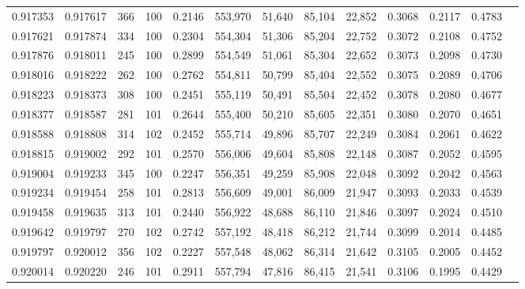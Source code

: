 \begin{tabular}{rrrrrrrrrrrrr}
0.917353 & 0.917617 &   366 & 100 &                                     0.2146 & 553,970 &  51,640 &  85,104 &  22,852 & 0.3068 & 0.2117 & 0.4783 \\
0.917621 & 0.917874 &   334 & 100 &                                     0.2304 & 554,304 &  51,306 &  85,204 &  22,752 & 0.3072 & 0.2108 & 0.4752 \\
0.917876 & 0.918011 &   245 & 100 &                                     0.2899 & 554,549 &  51,061 &  85,304 &  22,652 & 0.3073 & 0.2098 & 0.4730 \\
0.918016 & 0.918222 &   262 & 100 &                                     0.2762 & 554,811 &  50,799 &  85,404 &  22,552 & 0.3075 & 0.2089 & 0.4706 \\
0.918223 & 0.918373 &   308 & 100 &                                     0.2451 & 555,119 &  50,491 &  85,504 &  22,452 & 0.3078 & 0.2080 & 0.4677 \\
0.918377 & 0.918587 &   281 & 101 &                                     0.2644 & 555,400 &  50,210 &  85,605 &  22,351 & 0.3080 & 0.2070 & 0.4651 \\
0.918588 & 0.918808 &   314 & 102 &                                     0.2452 & 555,714 &  49,896 &  85,707 &  22,249 & 0.3084 & 0.2061 & 0.4622 \\
0.918815 & 0.919002 &   292 & 101 &                                     0.2570 & 556,006 &  49,604 &  85,808 &  22,148 & 0.3087 & 0.2052 & 0.4595 \\
0.919004 & 0.919233 &   345 & 100 &                                     0.2247 & 556,351 &  49,259 &  85,908 &  22,048 & 0.3092 & 0.2042 & 0.4563 \\
0.919234 & 0.919454 &   258 & 101 &                                     0.2813 & 556,609 &  49,001 &  86,009 &  21,947 & 0.3093 & 0.2033 & 0.4539 \\
0.919458 & 0.919635 &   313 & 101 &                                     0.2440 & 556,922 &  48,688 &  86,110 &  21,846 & 0.3097 & 0.2024 & 0.4510 \\
0.919642 & 0.919797 &   270 & 102 &                                     0.2742 & 557,192 &  48,418 &  86,212 &  21,744 & 0.3099 & 0.2014 & 0.4485 \\
0.919797 & 0.920012 &   356 & 102 &                                     0.2227 & 557,548 &  48,062 &  86,314 &  21,642 & 0.3105 & 0.2005 & 0.4452 \\
0.920014 & 0.920220 &   246 & 101 &                                     0.2911 & 557,794 &  47,816 &  86,415 &  21,541 & 0.3106 & 0.1995 & 0.4429 \\

\end{tabular}
